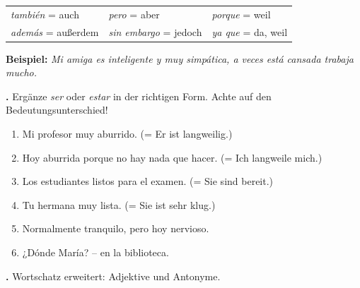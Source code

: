 \documentclass[11pt,a4paper]{article}
\newcommand{\luecke}[1]{\underline{\hspace{#1}}}
\newcommand{\punktebox}[1]{\hfill\fbox{\small \_\_/#1}}
\newcommand{\es}[1]{\textit{#1}}
\newcounter{aufgabe}
\newcommand{\aufgabe}[2]{%
    \stepcounter{aufgabe}%
    \vspace{0.8em}%
    \noindent\textbf{\theaufgabe.} #1 \punktebox{#2}%
    \vspace{0.3em}%
}
\begin{document}
\begin{merkkasten}
\vspace{0.2em}

\begin{tabularx}{\textwidth}{@{}X|X|X@{}}
\es{también} = auch & \es{pero} = aber & \es{porque} = weil \\
\es{además} = außerdem & \es{sin embargo} = jedoch & \es{ya que} = da, weil \\
\end{tabularx}

\vspace{0.3em}
\textbf{Beispiel:} \es{Mi amiga es inteligente y \luecke{2cm} muy simpática, \luecke{2cm} a veces está cansada \luecke{2cm} trabaja mucho.}
\vspace{0.3em}
\end{merkkasten}

\vspace{1em}


\aufgabe{Ergänze \es{ser} oder \es{estar} in der richtigen Form. Achte auf den Bedeutungsunterschied!}{6}

\begin{enumerate}[label=\alph*), leftmargin=2em]
    \item Mi profesor \luecke{2cm} muy aburrido. (= Er ist langweilig.)
    \item Hoy \luecke{2cm} aburrida porque no hay nada que hacer. (= Ich langweile mich.)
    \item Los estudiantes \luecke{2cm} listos para el examen. (= Sie sind bereit.)
    \item Tu hermana \luecke{2cm} muy lista. (= Sie ist sehr klug.)
    \item Normalmente \luecke{2cm} tranquilo, pero hoy \luecke{2cm} nervioso.
    \item ¿Dónde \luecke{2cm} María? -- \luecke{2cm} en la biblioteca.
\end{enumerate}

\vspace{0.5em}

\aufgabe{Wortschatz erweitert: Adjektive und Antonyme.}{6}
\end{document}
